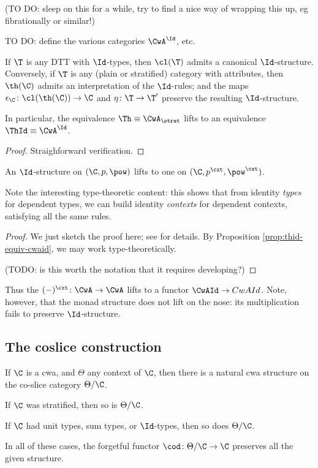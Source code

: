 (TO DO: sleep on this for a while, try to find a nice way of wrapping this up, eg fibrationally or similar!)

TO DO: define the various categories $\CwA^\Id$, etc.

\begin{proposition} \label{prop:thid-equiv-cwaid} If $\T$ is any DTT with $\Id$-types, then $\cl(\T)$ admits a canonical $\Id$-structure.  Conversely, if $\T$ is any (plain or stratified) category with attributes, then $\th(\C)$ admits an interpretation of the $\Id$-rules; and the maps $\epsilon_\C \colon \cl(\th(\C)) \to \C$ and $\eta \colon \T \to \T'$ preserve the resulting $\Id$-structure.

In particular, the equivalence $\Th \equiv \CwA_\strat$ lifts to an equivalence $\ThId \equiv \CwA^\Id$.

\begin{proof}Straighforward verification.
\end{proof}
\end{proposition}

\begin{proposition} An $\Id$-structure on $(\C,p,\pow)$ lifts to one on $(\C,p^\cxt,\pow^\cxt)$.
\end{proposition}

Note the interesting type-theoretic content: this shows that from identity \emph{types} for dependent types, we can build identity \emph{contexts} for dependent contexts, satisfying all the same rules.

\begin{proof}
We just sketch the proof here; see \cite[2.3.1]{garner:2-d-models} for details.  By Proposition \ref{prop:thid-equiv-cwaid}, we may work type-theoretically.

(TODO: is this worth the notation that it requires developing?)
\end{proof}

Thus the $(-)^\cxt \colon \CwA \to \CwA$ lifts to a functor $\CwAId \to CwAId$.  Note, however, that the monad structure does not lift on the nose: its multiplication fails to preserve $\Id$-structure.  %

\subsection*{The coslice construction}
\begin{proposition} If $\C$ is a cwa, and $\Theta$ any context of $\C$, then there is a natural cwa structure on the co-slice category $\Theta/\C$.

If $\C$ was stratified, then so is $\Theta/\C$.

If $\C$ had unit types, sum types, or $\Id$-types, then so does $\Theta/\C$.

In all of these cases, the forgetful functor $\cod \colon \Theta/\C \to \C$ preserves all the given structure.
\end{proposition}

